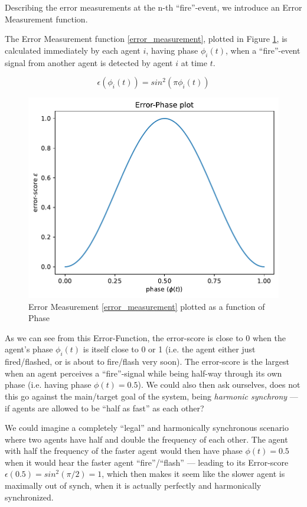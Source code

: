 			Describing the error measurements at the n-th ``fire''-event, we introduce an Error Measurement function.
			
			The Error Measurement function \eqref{error_measurement}, plotted in Figure \ref{fig:error_measurement}, is calculated immediately by each agent $i$, having phase $\phi_i(t)$, when a ``fire''-event signal from another agent is detected by agent $i$ at time $t$.
			
			\begin{equation}
			\label{error_measurement}
				\epsilon(\phi_i(t)) = sin^2(\pi\phi_i(t))
			\end{equation} \nl
			
			\begin{figure}[h!]
				\centering
				\includegraphics[width=0.8\linewidth]{Assets/Figures/PhaseErrorFunction.pdf}
				\caption{Error Measurement \eqref{error_measurement} plotted as a function of Phase}
				\label{fig:error_measurement}
			\end{figure}
			
			As we can see from this Error-Function, the error-score is close to 0 when the agent's phase $\phi_i(t)$ is itself close to 0 or 1 (i.e. the agent either just fired/flashed, or is about to fire/flash very soon). The error-score is the largest when an agent perceives a ``fire''-signal while being half-way through its own phase (i.e. having phase $\phi(t)=0.5$). We could also then ask ourselves, does not this go against the main/target goal of the system, being \textit{harmonic synchrony} — if agents are allowed to be ``half as fast'' as each other? 
			
			We could imagine a completely ``legal'' and harmonically synchronous scenario where two agents have half and double the frequency of each other. The agent with half the frequency of the faster agent would then have phase $\phi(t)=0.5$ when it would hear the faster agent ``fire''/``flash'' — leading to its Error-score $\epsilon(0.5) = sin^2(\pi/2) = 1$, which then makes it seem like the slower agent is maximally out of synch, when it is actually perfectly and harmonically synchronized.  
			
